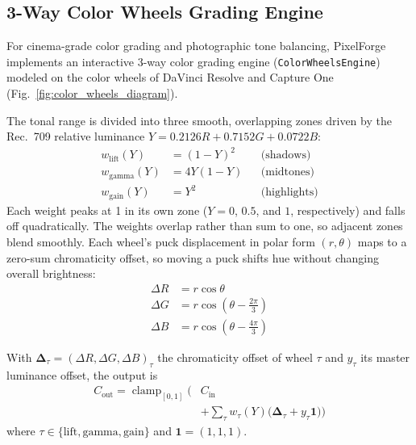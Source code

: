 \documentclass[10pt,journal,compsoc]{IEEEtran}
\begin{document}
\subsection{3-Way Color Wheels Grading Engine}
For cinema-grade color grading and photographic tone balancing, PixelForge implements an interactive 3-way color grading engine (\texttt{ColorWheelsEngine}) modeled on the color wheels of DaVinci Resolve and Capture One (Fig.~\ref{fig:color_wheels_diagram}).

The tonal range is divided into three smooth, overlapping zones driven by the Rec.~709 relative luminance $Y = 0.2126R + 0.7152G + 0.0722B$:
\begin{align}
w_{\text{lift}}(Y)  &= (1 - Y)^2 && \text{(shadows)} \\
w_{\text{gamma}}(Y) &= 4Y(1 - Y) && \text{(midtones)} \\
w_{\text{gain}}(Y)  &= Y^2       && \text{(highlights)}
\end{align}
Each weight peaks at 1 in its own zone ($Y = 0$, $0.5$, and $1$, respectively) and falls off quadratically. The weights overlap rather than sum to one, so adjacent zones blend smoothly. Each wheel's puck displacement in polar form $(r, \theta)$ maps to a zero-sum chromaticity offset, so moving a puck shifts hue without changing overall brightness:
\begin{align}
\Delta R &= r \cos \theta \\
\Delta G &= r \cos\left(\theta - \frac{2\pi}{3}\right) \\
\Delta B &= r \cos\left(\theta - \frac{4\pi}{3}\right)
\end{align}

With $\boldsymbol{\Delta}_\tau = (\Delta R, \Delta G, \Delta B)_\tau$ the chromaticity offset of wheel $\tau$ and $y_\tau$ its master luminance offset, the output is
\begin{equation}
\begin{aligned}
C_{\text{out}} = \operatorname{clamp}_{[0,1]}\Big( & C_{\text{in}} \\
&+ \sum_{\tau} w_\tau(Y) \big(\boldsymbol{\Delta}_\tau + y_\tau \mathbf{1}\big) \Big)
\end{aligned}
\end{equation}
where $\tau \in \{\text{lift}, \text{gamma}, \text{gain}\}$ and $\mathbf{1} = (1, 1, 1)$.
\end{document}
